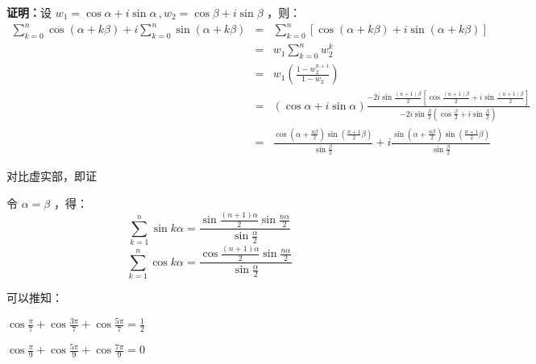 \textbf{证明：}设 $w_1=\cos \alpha+i\sin\alpha\,,w_2=\cos \beta+i\sin\beta$ ，则：
$$\begin{eqnarray*} \sum_{k=0}^n\cos(\alpha+k\beta)+i\sum_{k=0}^n\sin(\alpha+k\beta)&=&\sum_{k=0}^n\left[\cos(\alpha+k\beta)+i\sin(\alpha+k\beta)\right]\\&=&w_1\sum_{k=0}^nw_2^k \\&=&w_1\left(\frac{1-w_2^{n+1}}{1-w_2}\right)\\ &=&(\cos \alpha+i\sin\alpha)\frac{-2i\sin{\frac{(n+1)\beta}2}\left[\cos{\frac{(n+1)\beta}2}+i\sin{\frac{(n+1)\beta}2}\right]}{-2i\sin{\frac{\beta}2}\left(\cos{\frac{\beta}2}+i\sin{\frac{\beta}2}\right)}\\ &=&\frac{\cos\left(\alpha+\frac{n\beta}2\right)\sin\left(\frac{n+1}2\beta\right)}{\sin\frac{\beta}2}+i\frac{\sin\left(\alpha+\frac{n\beta}2\right)\sin\left(\frac{n+1}2\beta\right)}{\sin\frac{\beta}2} \end{eqnarray*}$$

对比虚实部，即证

令 $\alpha=\beta$ ，得：
$$\sum_{k=1}^n\sin k\alpha=\frac{\sin{\frac{(n+1)\alpha}2}\sin{\frac{n\alpha}{2}}}{\sin{\frac{\alpha}2}}$$ $$\sum_{k=1}^n\cos k\alpha=\frac{\cos{\frac{(n+1)\alpha}2}\sin{\frac{n\alpha}{2}}}{\sin{\frac{\alpha}2}}$$ 

可以推知：

$\displaystyle{\cos\frac{\pi}{7}+\cos\frac{3\pi}{7}+\cos\frac{5\pi}{7}=\frac{1}{2}}$

$\displaystyle{\cos\frac{\pi}{9}+\cos\frac{5\pi}{9}+\cos\frac{7\pi}{9}=0}$

